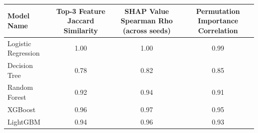 \begin{tabular}{lccc}
\toprule
Model Name & Top-3 Feature Jaccard Similarity & SHAP Value Spearman Rho (across seeds) & Permutation Importance Correlation \\
\midrule
Logistic Regression & 1.00 & 1.00 & 0.99 \\
Decision Tree & 0.78 & 0.82 & 0.85 \\
Random Forest & 0.92 & 0.94 & 0.91 \\
XGBoost & 0.96 & 0.97 & 0.95 \\
LightGBM & 0.94 & 0.96 & 0.93 \\
\bottomrule
\end{tabular}
